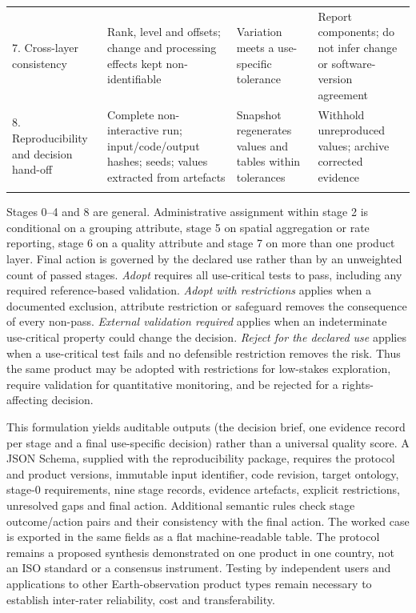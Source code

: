 \documentclass[pdflatex,sn-basic]{sn-jnl}
\begin{document}
\begin{table}[t]
\begin{tabularx}{\textwidth}{@{}p{}p{}YY@{}}
7. Cross-layer consistency & Rank, level and offsets; change and processing effects kept non-identifiable & Variation meets a use-specific tolerance & Report components; do not infer change or software-version agreement \\
8. Reproducibility and decision hand-off & Complete non-interactive run; input/code/output hashes; seeds; values extracted from artefacts & Snapshot regenerates values and tables within tolerances & Withhold unreproduced values; archive corrected evidence \\
\botrule
\end{tabularx}
\end{table}

Stages 0--4 and 8 are general. Administrative assignment within stage 2 is conditional on a grouping attribute, stage 5 on spatial aggregation or rate reporting, stage 6 on a quality attribute and stage 7 on more than one product layer. Final action is governed by the declared use rather than by an unweighted count of passed stages. \emph{Adopt} requires all use-critical tests to pass, including any required reference-based validation. \emph{Adopt with restrictions} applies when a documented exclusion, attribute restriction or safeguard removes the consequence of every non-pass. \emph{External validation required} applies when an indeterminate use-critical property could change the decision. \emph{Reject for the declared use} applies when a use-critical test fails and no defensible restriction removes the risk. Thus the same product may be adopted with restrictions for low-stakes exploration, require validation for quantitative monitoring, and be rejected for a rights-affecting decision.

This formulation yields auditable outputs (the decision brief, one evidence record per stage and a final use-specific decision) rather than a universal quality score. A JSON Schema, supplied with the reproducibility package, requires the protocol and product versions, immutable input identifier, code revision, target ontology, stage-0 requirements, nine stage records, evidence artefacts, explicit restrictions, unresolved gaps and final action. Additional semantic rules check stage outcome/action pairs and their consistency with the final action. The worked case is exported in the same fields as a flat machine-readable table. The protocol remains a proposed synthesis demonstrated on one product in one country, not an ISO standard or a consensus instrument. Testing by independent users and applications to other Earth-observation product types remain necessary to establish inter-rater reliability, cost and transferability.
\end{document}
